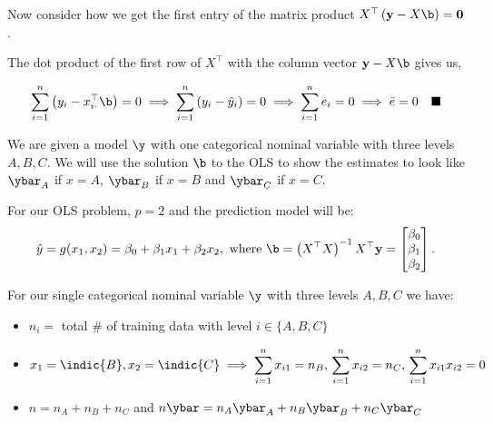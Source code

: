 \documentclass[12pt]{article}
\newcommand{\snmath}{\displaystyle\sum_{i=1}^n}
\newcommand{\na}{n_A}
\newcommand{\nb}{n_B}
\newcommand{\nc}{n_C}
\begin{document}
\begin{enumerate}
\begin{tcolorbox}[colback=white, sharp corners]
Now consider how we get the first entry of the matrix product $ X^\top \left(\mathbf{y} - X \b  \right) = \mathbf{0}$. 

The dot product of the first row of $X^\top$ with the column vector 
$\mathbf{y} - X \b$ gives us, 

\[
	\sum_{i = 1}^n \left( y_i - x_{i \cdot}^\top \b \right) =0 \implies \sum_{i = 1}^n \left( y_i - \hat{y}_i \right) = 0 \implies \sum_{i=1}^n e_i = 0 \implies \bar{e} = 0 \quad \blacksquare
\]

\end{tcolorbox}

\newpage


\begin{tcolorbox}[colback=white, sharp corners]

We are given a model $\y$ with one categorical nominal variable with three levels $A, B, C$. We will use the solution $\b$ to the OLS to show the estimates to look like $\ybar_A$ if $x = A$, $\ybar_B$ if $x = B$ and $\ybar_C$ if $x = C$.  

\vspace{2mm}

For our OLS problem, $p = 2$ and the prediction model will be: \[
\hat{y} = g(x_1, x_2) = \beta_0 + \beta_1 x_1 + \beta_2 x_2,\text{ where  }\b = \left(X^\top X \right)^{-1} X^\top \mathbf{y} = \begin{bmatrix} \beta_0 \\ \beta_1 \\ \beta_2 \end{bmatrix}.
\] 

For our single categorical nominal variable $\y$ with three levels $A, B, C$ we have: 

\begin{itemize}
\item $n_i =$ total \# of training data with level $i \in \lbrace A, B, C \rbrace $
\item $x_1 =  \indic{B}, x_2 = \indic{C} \implies  \snmath x_{i1} = \nb, \, \snmath x_{i2} = \nc, \,  \snmath x_{i1} x_{i2} = 0$
\item $n = \na + \nb + \nc $ and $n \ybar = \na\ybar_A + \nb \ybar_B + \nc \ybar_C$
\end{itemize}


\end{tcolorbox}
\end{enumerate}
\end{document}
